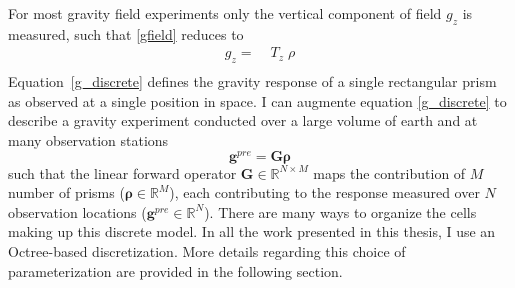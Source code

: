 For most gravity field experiments only the vertical component of field $g_z$ is measured, such that \eqref{gfield} reduces to
\begin{equation}
\begin{split}
g_z =\;& {T}_z \;{\rho} \\
\end{split}\label{g_discrete}
\end{equation}
Equation~\eqref{g_discrete} defines the gravity response of a single rectangular prism as observed at a single position in space. I can augmente equation \eqref{g_discrete} to describe a gravity experiment conducted over a large volume of earth and at many observation stations
\begin{equation}\label{g_discrete_large}
	\mathbf{g}^{pre} = \mathbf{G} \boldsymbol{\rho}
\end{equation}
such that the linear forward operator $\mathbf{G}\in \mathbb{R}^{N\times M}$ maps the contribution of $M$ number of prisms ($\boldsymbol{\rho} \in \mathbb{R}^M$), each contributing to the response measured over $N$ observation locations ($\mathbf{g}^{pre} \in \mathbb{R}^{N}$).
There are many ways to organize the cells making up this discrete model.
In all the work presented in this thesis, I use an Octree-based discretization.
More details regarding this choice of parameterization are provided in the following section.

